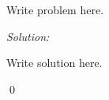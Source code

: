 \documentclass[12pt]{article}
\newenvironment{problem}[2][Problem]{\begin{trivlist}
\item[\hskip \labelsep {\bfseries #1}\hskip \labelsep {\bfseries #2.}]}{\end{trivlist}}
\newenvironment{sol}
    {\emph{Solution:}
    }
    {
    \qed
    }
\begin{document}
\begin{problem}{1.1}
Write problem here.
\end{problem}
\begin{sol}
Write solution here.\\
\end{sol}
\end{document}
